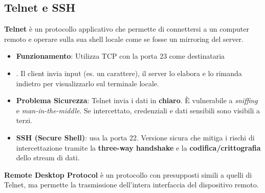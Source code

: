 \documentclass[12pt,a4paper,oneside]{book}
\begin{document}
\subsection{Telnet e SSH}
\textbf{Telnet} è un protocollo applicativo che permette di connettersi a un computer remoto e operare sulla sua shell locale come se fosse un mirroring del server.
\begin{itemize}
    \item \textbf{Funzionamento}: Utilizza TCP con la porta 23 come destinataria
    \item . Il client invia input (es. un carattere), il server lo elabora e lo rimanda indietro per visualizzarlo sul terminale locale.
    \item \textbf{Problema Sicurezza}: Telnet invia i dati in \textbf{chiaro}. È vulnerabile a \textit{sniffing} e \textit{man-in-the-middle}. Se intercettato, credenziali e dati sensibili sono visibili a terzi.
    \item \textbf{SSH (Secure Shell)}: usa la porta 22. Versione sicura che mitiga i rischi di intercettazione tramite la \textbf{three-way handshake} e la \textbf{codifica/crittografia} dello stream di dati.
\end{itemize}
\textbf{Remote Desktop Protocol} è un protocollo con presupposti simili a quelli di Telnet, ma permette la trasmissione dell'intera interfaccia del dispositivo remoto.
\end{document}
